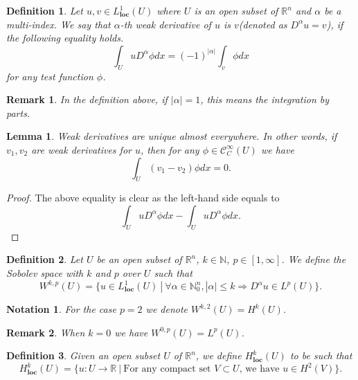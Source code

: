 \documentclass{article}
\newtheorem{definition}{Definition}[section]
\newtheorem{lemma}{Lemma}[section]
\newtheorem{notation}{Notation}[section]
\newtheorem{remark}{Remark}[section]
\numberwithin{equation}{section}
\begin{document}
\begin{definition}
Let $u,v\in L^1_{\mathbf{loc}}(U)$ where $U$ is an open subset of $\mathbb{R}^n$ and $\alpha$ be a multi-index. We say that $\alpha$-th weak derivative of $u$ is $v$(denoted as $D^\alpha u=v$), if the following equality holds.
\begin{equation*}
\int_U uD^\alpha\phi dx = (-1)^{|\alpha|}\int_v\phi dx
\end{equation*}
for any test function $\phi$. 
\end{definition}

\begin{remark}
In the definition above, if $|\alpha|=1$, this means the integration by parts.
\end{remark}

\begin{lemma}
Weak derivatives are unique almost everywhere. In other words, if $v_1,v_2$ are weak derivatives for $u$, then for any $\phi\in\mathcal{C}^\infty_C(U)$ we have
\begin{equation*}
\int_U (v_1-v_2)\phi dx = 0.
\end{equation*}
\end{lemma}

\begin{proof}
The above equality is clear as the left-hand side equals to 
\begin{equation*}\int_U uD^\alpha \phi dx-\int_U uD^\alpha \phi dx.
\end{equation*}
\end{proof}

\begin{definition}
Let $U$ be an open subset of $\mathbb{R}^n$, $k\in\mathbb{N}$, $p\in[1,\infty]$. We define the Sobolev space with $k$ and $p$ over $U$ such that 
\begin{equation*}
W^{k,p}(U) = \{u\in L^1_{\mathbf{loc}}(U)\:|\: \forall \alpha\in\mathbb{N}_0^n, |\alpha|\leq k \Rightarrow D^\alpha u\in L^p(U)\}.
\end{equation*}
\end{definition}

\begin{notation}
For the case $p=2$ we denote $W^{k,2}(U) = H^k(U)$. 
\end{notation}

\begin{remark}
When $k=0$ we have $W^{0,p}(U) = L^p(U)$.
\end{remark}

\begin{definition}
Given an open subset $U$ of $\mathbb{R}^n$, we define $H^k_{\mathbf{loc}}(U)$ to be such that 
\begin{equation*}
H^k_{\mathbf{loc}}(U) =\{u:U\to\mathbb{R}\:|\: \text{For any compact set $V\subset U$, we have }u\in H^2(V)\}.
\end{equation*}
\end{definition}
\end{document}
